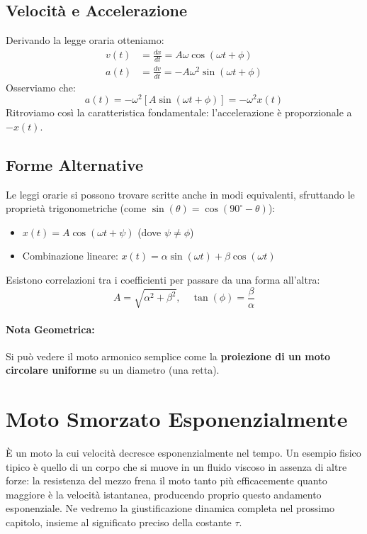 \subsection{Velocità e Accelerazione}
Derivando la legge oraria otteniamo:
\begin{align}
    v(t) &= \frac{dx}{dt} = A\omega \cos(\omega t + \phi) \\
    a(t) &= \frac{dv}{dt} = -A\omega^2 \sin(\omega t + \phi)
\end{align}
Osserviamo che:
\begin{equation}
    a(t) = -\omega^2 [A \sin(\omega t + \phi)] = -\omega^2 x(t)
\end{equation}
Ritroviamo così la caratteristica fondamentale: l'accelerazione è proporzionale a $-x(t)$.

\subsection{Forme Alternative}
Le leggi orarie si possono trovare scritte anche in modi equivalenti, sfruttando le proprietà trigonometriche (come $\sin(\theta) = \cos(90^\circ - \theta)$):
\begin{itemize}
    \item $x(t) = A \cos(\omega t + \psi)$ (dove $\psi \neq \phi$)
    \item Combinazione lineare: $x(t) = \alpha \sin(\omega t) + \beta \cos(\omega t)$
\end{itemize}
Esistono correlazioni tra i coefficienti per passare da una forma all'altra:
\begin{equation}
    A = \sqrt{\alpha^2 + \beta^2}, \quad \tan(\phi) = \frac{\beta}{\alpha}
\end{equation}

\paragraph{Nota Geometrica:}
Si può vedere il moto armonico semplice come la \textbf{proiezione di un moto circolare uniforme} su un diametro (una retta).

\section{Moto Smorzato Esponenzialmente}
È un moto la cui velocità decresce esponenzialmente nel tempo. Un esempio fisico tipico è quello di un corpo che si muove in un fluido viscoso in assenza di altre forze: la resistenza del mezzo frena il moto tanto più efficacemente quanto maggiore è la velocità istantanea, producendo proprio questo andamento esponenziale. Ne vedremo la giustificazione dinamica completa nel prossimo capitolo, insieme al significato preciso della costante $\tau$.

